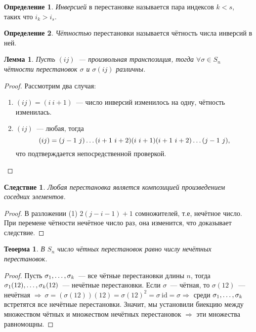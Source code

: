 \documentclass[a4paper, 14pt]{extarticle}
\newcommand{\id}{\mathrm{id}}
\theoremstyle{definition}
\newtheorem{definition}{Определение}
\theoremstyle{plain}
\newtheorem{theorem}{Теоерма}
\numberwithin{theorem}{section}
\numberwithin{definition}{section}
\numberwithin{statement}{section}
\newtheorem{lemma}{Лемма}
\numberwithin{lemma}{section}
\newtheorem*{consequence*}{Следствие}
\numberwithin{consequence}{section}
\begin{document}
        \begin{definition}
        \textit{Инверсией} в перестановке называется пара индексов $k < s$, таких что $i_k > i_s$.
        \end{definition}
        \begin{definition}
            \textit{Чётностью} перестановки называется чётность числа инверсий в ней.
        \end{definition}
        \begin{lemma}
            Пусть $(ij)$~--- произвольная транспозиция, тогда ${\forall \sigma \in S_n}$ чётности перестановок $\sigma$ и $\sigma (ij)$ различны.
        \end{lemma}
        \begin{proof}
            Рассмотрим два случая:
            \begin{enumerate}
                \setlength\itemsep{0.1em}
                \item $(ij) = (i \ i+1)$~--- число инверсий изменилось на одну, чётность изменилась.
                \item $(ij)$~--- любая, тогда
                \begin{equation}
                    (ij) = (j-1 \ j)\mathellipsis(i+1 \ i+2)(i \ i+1)(i+1 \ i+2)\mathellipsis(j-1 \ j),
                \end{equation}
                что подтверждается непосредственной проверкой. \qedhere
            \end{enumerate}
        \end{proof}
        \begin{consequence*}
            Любая перестановка является композицией произведением соседних элементов.
        \end{consequence*}
        \begin{proof}
            В разложении (1) $2(j - i - 1) + 1$ сомножителей, т.е, нечётное число. При перемене чётности нечётное число раз, она изменится, что доказывает следствие.
        \end{proof}
        \begin{theorem}
            В $S_n$ число чётных перестановок равно числу нечётных перестановок.
        \end{theorem}
        \begin{proof}
            Пусть $\sigma_1,\mathellipsis,\sigma_k$~--- все чётные перестановки длины $n$, тогда $\sigma_1(12),\mathellipsis,\sigma_k(12)$~--- нечётные перестановки. Если $\sigma$~--- чётная, то $\sigma (12)$~--- нечётная $\Longrightarrow \ {\sigma = (\sigma (12))(12) = \sigma (12)^2 = \sigma \ \id = \sigma} \Longrightarrow$ среди $\sigma_1,\mathellipsis,\sigma_k$ встретятся все нечётные перестановки. Значит, мы установили биекцию между множеством чётных и множеством нечётных перестановок $\Longrightarrow$ эти множества равномощны.
        \end{proof}
\end{document}
